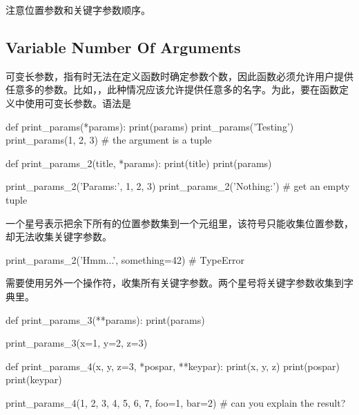 注意位置参数和关键字参数顺序。
\subsection{Variable Number Of Arguments}
可变长参数，指有时无法在定义函数时确定参数个数，因此函数必须允许用户提供任意多的参数。比如，，此种情况应该允许提供任意多的名字。为此，要在函数定义中使用可变长参数。语法是
\begin{python}
def print_params(*params):
    print(params)
    print_params('Testing') print_params(1, 2, 3) # the argument is a
    tuple

def print_params_2(title, *params):
    print(title)
    print(params)

print_params_2('Params:', 1, 2, 3)
print_params_2('Nothing:')  # get an empty tuple
\end{python}

一个星号表示把余下所有的位置参数集到一个元组里，该符号只能收集位置参数，却无法收集关键字参数。
\begin{python}
print_params_2('Hmm...', something=42)  # TypeError
\end{python}
需要使用另外一个操作符，收集所有关键字参数。两个星号将关键字参数收集到字典里。
\begin{python}
def print_params_3(**params):
    print(params)

print_params_3(x=1, y=2, z=3)

def print_params_4(x, y, z=3, *pospar, **keypar):
    print(x, y, z)
    print(pospar)
    print(keypar)

print_params_4(1, 2, 3, 4, 5, 6, 7, foo=1, bar=2)  # can you explain the result?
\end{python}
